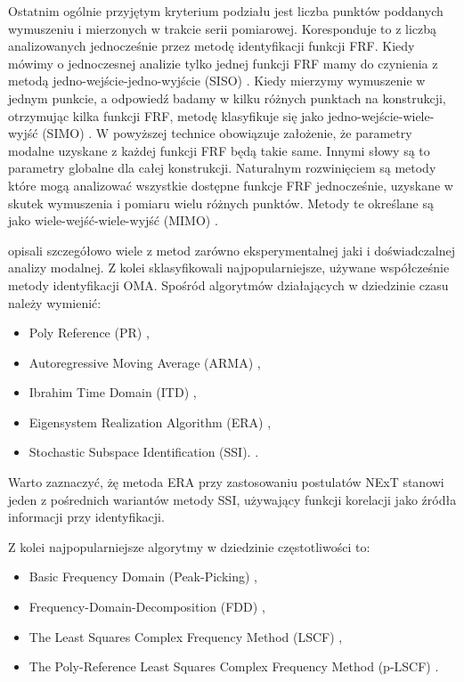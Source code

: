 Ostatnim ogólnie przyjętym kryterium podziału jest liczba punktów poddanych wymuszeniu i mierzonych w trakcie serii pomiarowej. Koresponduje to z liczbą analizowanych jednocześnie przez metodę identyfikacji funkcji FRF. Kiedy mówimy o jednoczesnej analizie tylko jednej funkcji FRF mamy do czynienia z metodą jedno-wejście-jedno-wyjście (SISO) . Kiedy mierzymy wymuszenie w jednym punkcie, a odpowiedź badamy w kilku różnych punktach na konstrukcji, otrzymując kilka funkcji FRF, metodę klasyfikuje się jako jedno-wejście-wiele-wyjść (SIMO) . W powyższej technice obowiązuje założenie, że parametry modalne uzyskane z każdej funkcji FRF będą takie same. Innymi słowy są to parametry globalne dla całej konstrukcji. Naturalnym rozwinięciem są metody które mogą analizować wszystkie dostępne funkcje FRF jednocześnie, uzyskane w skutek wymuszenia i pomiaru wielu różnych punktów. Metody te określane są jako wiele-wejść-wiele-wyjść (MIMO) .

\cite{Maia1997} opisali szczegółowo wiele z metod zarówno eksperymentalnej jaki i doświadczalnej analizy modalnej. Z kolei \cite{Brincker2015} sklasyfikowali najpopularniejsze, używane współcześnie metody identyfikacji OMA. Spośród algorytmów działających w dziedzinie czasu należy wymienić:
\begin{itemize}[noitemsep]
\item Poly Reference (PR) \parencite{Norton2009,Vold1982},
\item Autoregressive Moving Average (ARMA) \parencite{Shi1987,Huang2000,Giorcelli1994},
\item Ibrahim Time Domain (ITD) \parencite{Ibrahim1983,Pappa1985a},
\item Eigensystem Realization Algorithm (ERA) \parencite{Juang1985,Pappa1985,Juang1988},
\item Stochastic Subspace Identification (SSI). \parencite{VanOverschee1996,Peeters1999a,Peeters2000}. 
\end{itemize}

Warto zaznaczyć, żę metoda ERA przy zastosowaniu postulatów NExT stanowi jeden z pośrednich wariantów metody SSI, używający funkcji korelacji jako źródła informacji przy identyfikacji.

Z kolei najpopularniejsze algorytmy w dziedzinie częstotliwości to:
\begin{itemize}[noitemsep]
\item Basic Frequency Domain (Peak-Picking) \parencite{Felber1994},
\item Frequency-Domain-Decomposition (FDD) \parencite{Brincker2000,Brincker2001a,Brincker2001b},
\item The Least Squares Complex Frequency Method (LSCF) \parencite{Verboven2005},
\item The Poly-Reference Least Squares Complex Frequency Method (p-LSCF) \parencite{Peeters2005}.
\end{itemize}



